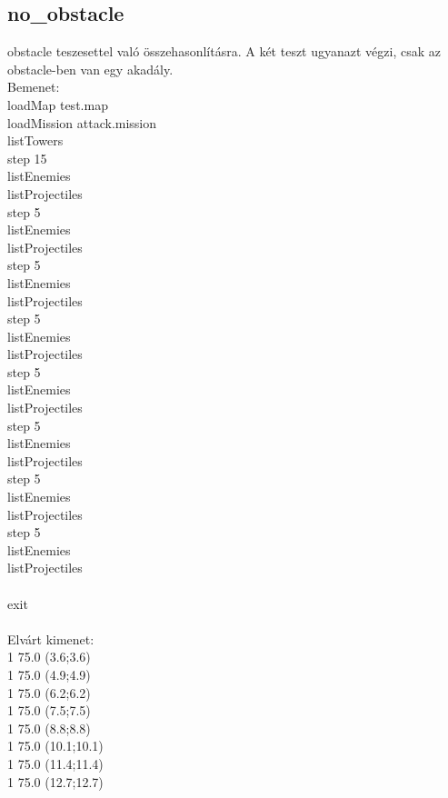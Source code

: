 \subsection{no\_obstacle}
obstacle teszesettel való összehasonlításra. A két teszt ugyanazt végzi, csak az obstacle-ben van egy akadály.\\
Bemenet:\\
loadMap test.map\\
loadMission attack.mission\\
listTowers\\
step 15\\
listEnemies\\
listProjectiles\\
step 5\\
listEnemies\\
listProjectiles\\
step 5\\
listEnemies\\
listProjectiles\\
step 5\\
listEnemies\\
listProjectiles\\
step 5\\
listEnemies\\
listProjectiles\\
step 5\\
listEnemies\\
listProjectiles\\
step 5\\
listEnemies\\
listProjectiles\\
step 5\\
listEnemies\\
listProjectiles\\
\\
exit\\
\\
Elvárt kimenet:\\
1 75.0 (3.6;3.6)\\
1 75.0 (4.9;4.9)\\
1 75.0 (6.2;6.2)\\
1 75.0 (7.5;7.5)\\
1 75.0 (8.8;8.8)\\
1 75.0 (10.1;10.1)\\
1 75.0 (11.4;11.4)\\
1 75.0 (12.7;12.7)\\
